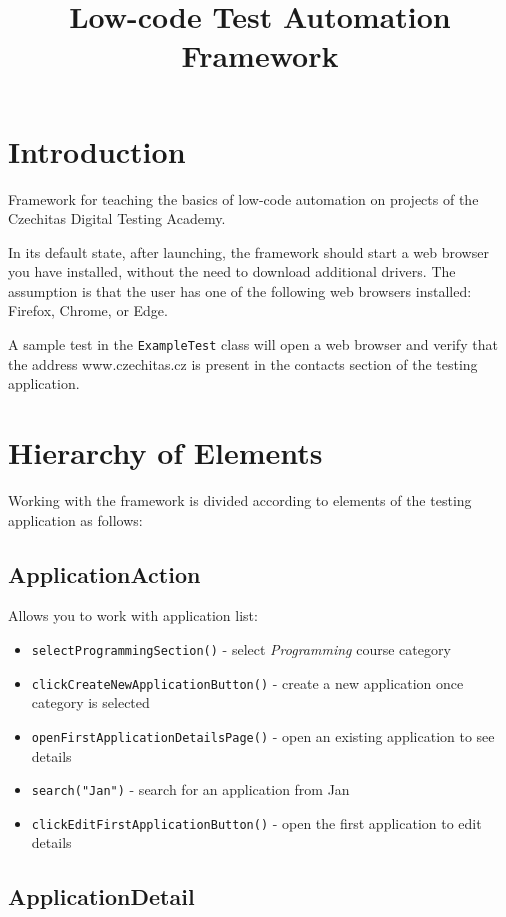 \documentclass{article}
\title{Low-code Test Automation Framework}
\author{}
\date{}
\let\oldtexttt\texttt
\renewcommand{\texttt}[1]{%
  \colorbox{gray!30}{\oldtexttt{#1}}%
}
\begin{document}
\maketitle

\section*{Introduction}

Framework for teaching the basics of low-code automation on projects of the Czechitas Digital Testing Academy.

In its default state, after launching, the framework should start a web browser you have installed, without the need to download additional drivers. The assumption is that the user has one of the following web browsers installed: Firefox, Chrome, or Edge.

A sample test in the \texttt{ExampleTest} class will open a web browser and verify that the address www.czechitas.cz is present in the contacts section of the testing application.

\section*{Hierarchy of Elements}

Working with the framework is divided according to elements of the testing application as follows:

\subsection*{ApplicationAction}

Allows you to work with application list:
\begin{itemize}
  \item \texttt{selectProgrammingSection()} - select \textit{Programming} course category
  \item \texttt{clickCreateNewApplicationButton()} - create a new application once category is selected
  \item \texttt{openFirstApplicationDetailsPage()} - open an existing application to see details
  \item \texttt{search("Jan")} - search for an application from Jan
  \item \texttt{clickEditFirstApplicationButton()} - open the first application to edit details
\end{itemize}

\subsection*{ApplicationDetail}
\end{document}
